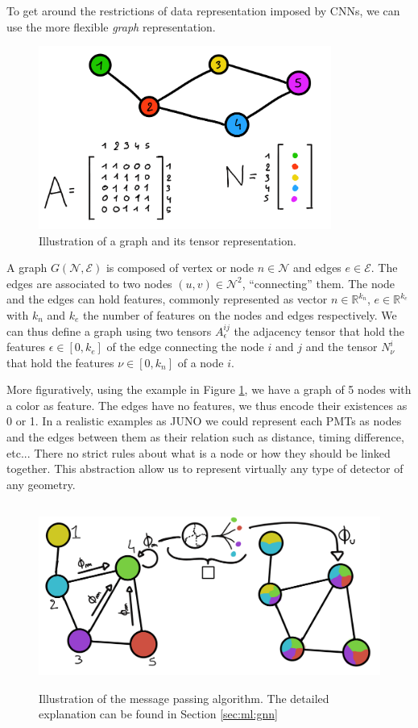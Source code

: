 \documentclass[../main.tex]{subfiles}
\begin{document}
To get around the restrictions of data representation imposed by CNNs, we can use the more flexible \textit{graph} representation.
\begin{figure}[ht]
  \centering
  \includegraphics[height=6cm]{images/ml/graph_illustration.png}
  \caption{Illustration of a graph and its tensor representation.}
  \label{fig:ml:gnn:graph}
\end{figure}
A graph $G(\mathcal{N},\mathcal{E})$ is composed of vertex or node $n \in \mathcal{N}$ and edges $e \in \mathcal{E}$. The edges are associated to two nodes $(u, v) \in \mathcal{N}^2$, ``connecting'' them. The node and the edges can hold features, commonly represented as vector $n \in \mathbb{R}^{k_{n}}$, $e \in \mathbb{R}^{k_{e}}$ with $k_n$ and $k_e$ the number of features on the nodes and edges respectively. We can thus define a graph using two tensors $A^{ij}_{\epsilon}$ the adjacency tensor that hold the features $\epsilon \in [0, k_e]$ of the edge connecting the node $i$ and $j$ and the tensor $N^{i}_{\nu}$ that hold the features $\nu \in [0, k_n]$ of a node $i$.

More figuratively, using the example in Figure \ref{fig:ml:gnn:graph}, we have a graph of 5 nodes with a color as feature. The edges have no features, we thus encode their existences as 0 or 1. In a realistic examples as JUNO we could represent each PMTs as nodes and the edges between them as their relation such as distance, timing difference, etc... There no strict rules about what is a node or how they should be linked together. This abstraction allow us to represent virtually any type of detector of any geometry.

\begin{figure}[ht]
  \centering
  \includegraphics[height=6cm]{images/ml/message_passing.png}
  \caption{Illustration of the message passing algorithm. The detailed explanation can be found in Section \ref{sec:ml:gnn}}
  \label{fig:ml:gnn:message_passing}
\end{figure}
\end{document}

